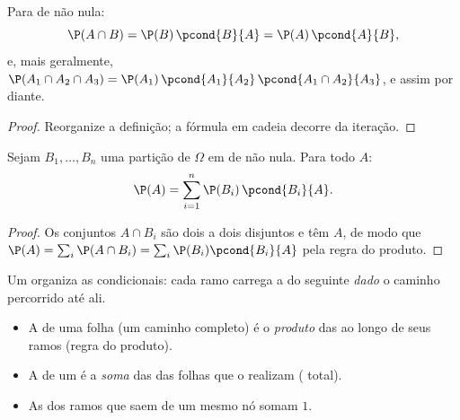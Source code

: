 \begin{proposition}\label{prop:g12:condprob:product}
Para  de  não nula:
\[
\P(A \cap B) = \P(B)\,\pcond{B}{A} = \P(A)\,\pcond{A}{B},
\]
e, mais geralmente,
$\P(A_1 \cap A_2 \cap A_3) = \P(A_1)\,\pcond{A_1}{A_2}\,
\pcond{A_1 \cap A_2}{A_3}$, e assim por diante.
\end{proposition}

\begin{proof}
Reorganize a definição; a fórmula em cadeia decorre da iteração.
\end{proof}

\begin{theorem}\label{thm:g12:condprob:total}
Sejam $B_1, \dots, B_n$ uma partição de $\Omega$ em  de
 não nula. Para todo  $A$:
\[
\P(A) = \sum_{i=1}^{n} \P(B_i)\,\pcond{B_i}{A}.
\]
\end{theorem}

\begin{proof}
Os conjuntos $A \cap B_i$ são dois a dois disjuntos e têm  $A$, de
modo que $\P(A) = \sum_i \P(A \cap B_i) = \sum_i \P(B_i)\pcond{B_i}{A}$
pela regra do produto.
\end{proof}

\begin{method}\label{met:g12:condprob:tree}
Um  organiza as  condicionais: cada ramo
carrega a  do  seguinte \emph{dado} o caminho
percorrido até ali.
\begin{itemize}
  \item A  de uma folha (um caminho completo) é o
        \emph{produto} das  ao longo de seus ramos (regra do
        produto).
  \item A  de um  é a \emph{soma} das 
        das folhas que o realizam ( total).
  \item As  dos ramos que saem de um mesmo nó somam $1$.
\end{itemize}
\end{method}

